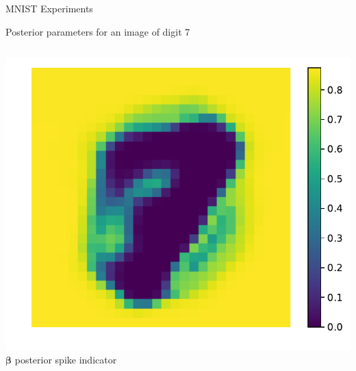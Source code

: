 \documentclass[9pt]{beamer}
\begin{document}
\begin{frame}{MNIST Experiments}
\begin{block}{Posterior parameters for an image of digit 7}
\begin{columns}
\begin{column}{0.33\textwidth}
        \includegraphics[width=0.75\columnwidth]{graphics/posterior_spike_indicator}\\
        \(\boldsymbol\beta \) posterior spike indicator
      \end{column}
    \end{columns}
  \end{block}


\end{frame}
\end{document}
